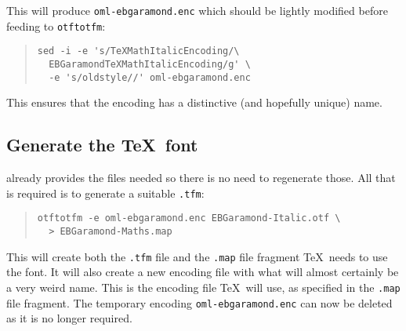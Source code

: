 \documentclass[12pt,british,a4paper]{article}
\begin{document}
This will produce \verb|oml-ebgaramond.enc| which should be lightly modified before feeding to \verb|otftotfm|:

\begin{quote}
\begin{verbatim}
sed -i -e 's/TeXMathItalicEncoding/\
  EBGaramondTeXMathItalicEncoding/g' \
  -e 's/oldstyle//' oml-ebgaramond.enc
\end{verbatim}
\end{quote}

This ensures that the encoding has a distinctive (and hopefully unique) name.

\subsection{Generate the \TeX\ font}\label{subsec:tfm}
\lpack{ebgaramond} already provides the  files needed so there is no need to regenerate those.
All that is required is to generate a suitable \verb|.tfm|:

\begin{quote}
\begin{verbatim}
otftotfm -e oml-ebgaramond.enc EBGaramond-Italic.otf \
  > EBGaramond-Maths.map
\end{verbatim}
\end{quote}

This will create both the \verb|.tfm| file and the \verb|.map| file fragment \TeX\ needs to use the font.
It will also create a new encoding file with what will almost certainly be a very weird name.
This is the encoding file \TeX\ will use, as specified in the \verb|.map| file fragment.
The temporary encoding \verb|oml-ebgaramond.enc| can now be deleted as it is no longer required.

\end{document}
